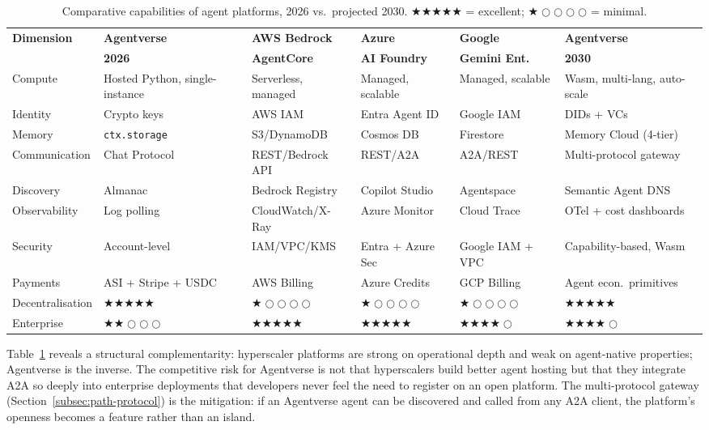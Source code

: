 \documentclass[twoside,11pt]{article}
\begin{document}
\begin{table}[htbp]
\centering
\caption{Comparative capabilities of agent platforms, 2026 vs.\ projected 2030.
$\bigstar\bigstar\bigstar\bigstar\bigstar$ = excellent;
$\bigstar\bigcirc\bigcirc\bigcirc\bigcirc$ = minimal.}
\label{tab:platform-comparison}
\footnotesize
\begin{tabular}{p{2.1cm}p{2.1cm}p{2.1cm}p{2.1cm}p{2.1cm}|p{2.2cm}}
\toprule
\textbf{Dimension} &
\textbf{Agentverse} &
\textbf{AWS Bedrock} &
\textbf{Azure} &
\textbf{Google} &
\textbf{Agentverse} \\
& \textbf{2026} & \textbf{AgentCore} & \textbf{AI Foundry} &
\textbf{Gemini Ent.} & \textbf{2030} \\
\midrule
Compute & Hosted Python, single-instance & Serverless, managed &
Managed, scalable & Managed, scalable & Wasm, multi-lang, auto-scale \\
Identity & Crypto keys & AWS IAM & Entra Agent ID & Google IAM &
DIDs + VCs \\
Memory & \texttt{ctx.storage} & S3/DynamoDB & Cosmos DB & Firestore &
Memory Cloud (4-tier) \\
Communication & Chat Protocol & REST/Bedrock API & REST/A2A & A2A/REST &
Multi-protocol gateway \\
Discovery & Almanac & Bedrock Registry & Copilot Studio & Agentspace &
Semantic Agent DNS \\
Observability & Log polling & CloudWatch/X-Ray & Azure Monitor &
Cloud Trace & OTel + cost dashboards \\
Security & Account-level & IAM/VPC/KMS & Entra + Azure Sec &
Google IAM + VPC & Capability-based, Wasm \\
Payments & ASI + Stripe + USDC & AWS Billing & Azure Credits & GCP Billing &
Agent econ.\ primitives \\
Decentralisation & $\bigstar\bigstar\bigstar\bigstar\bigstar$ &
$\bigstar\bigcirc\bigcirc\bigcirc\bigcirc$ &
$\bigstar\bigcirc\bigcirc\bigcirc\bigcirc$ &
$\bigstar\bigcirc\bigcirc\bigcirc\bigcirc$ &
$\bigstar\bigstar\bigstar\bigstar\bigstar$ \\
Enterprise & $\bigstar\bigstar\bigcirc\bigcirc\bigcirc$ &
$\bigstar\bigstar\bigstar\bigstar\bigstar$ &
$\bigstar\bigstar\bigstar\bigstar\bigstar$ &
$\bigstar\bigstar\bigstar\bigstar\bigcirc$ &
$\bigstar\bigstar\bigstar\bigstar\bigcirc$ \\
\bottomrule
\end{tabular}
\end{table}

Table~\ref{tab:platform-comparison} reveals a structural complementarity:
hyperscaler platforms are strong on operational depth and weak on agent-native
properties; Agentverse is the inverse.  The competitive risk for Agentverse is
not that hyperscalers build better agent hosting but that they integrate A2A so
deeply into enterprise deployments that developers never feel the need to
register on an open platform.  The multi-protocol gateway (Section~\ref{subsec:path-protocol})
is the mitigation: if an Agentverse agent can be discovered and called from any
A2A client, the platform's openness becomes a feature rather than an island.
\end{document}
